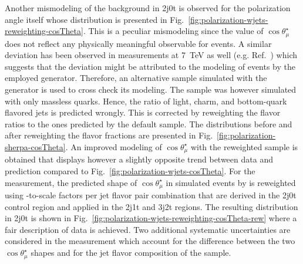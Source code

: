 Another mismodeling of the \wjets background in 2j0t is observed for the polarization angle itself whose distribution is presented in Fig.~\ref{fig:polarization-wjets-reweighting-cosTheta}. This is a peculiar mismodeling since the value of $\cos\theta_\mu^\star$ does not reflect any physically meaningful observable for \wjets events. A similar deviation has been observed in measurements at 7~TeV as well (e.g. Ref.~\cite{Komm-thesis}) which suggests that the deviation might be attributed to the modeling of \wjets events by the employed \MG generator. Therefore, an alternative \wjets sample simulated with the \SHERPA generator is used to cross check its modeling. The sample was however simulated with only massless quarks. Hence, the ratio of light, charm, and bottom-quark flavored jets is predicted wrongly. This is corrected by reweighting the flavor ratios to the ones predicted by the default \MG sample. The distributions before and after reweighting the flavor fractions are presented in Fig.~\ref{fig:polarization-sherpa-cosTheta}. An improved modeling of $\cos\theta_{\mu}^\star$ with the reweighted \SHERPA sample is obtained that displays however a slightly opposite trend between data and prediction compared to Fig.~\ref{fig:polarization-wjets-cosTheta}. For the measurement, the predicted shape of $\cos\theta_{\mu}^\star$ in simulated \wjets events by \MG is reweighted using \MG-to-\SHERPA scale factors per jet flavor pair combination that are derived in the 2j0t control region and applied in the 2j1t and 3j2t regions. The resulting distribution in 2j0t is shown in Fig.~\ref{fig:polarization-wjets-reweighting-cosTheta-rew} where a fair description of data is achieved. Two additional systematic uncertainties are considered in the measurement which account for the difference between the two $\cos\theta_\mu^\star$ shapes and for the jet flavor composition of the \wjets sample.



